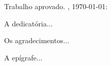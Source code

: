 \imprimircapa
\imprimirfolhaderosto


\begin{folhadeaprovacao}
    \begin{center}
        {\ABNTEXchapterfont\large\imprimirautor}
        \vspace*{\fill}\vspace*{\fill}
        \begin{center}
            \ABNTEXchapterfont\bfseries\Large\imprimirtitulo
        \end{center}
        \vspace*{\fill}
    \hspace{.45\textwidth}
    \begin{minipage}{.5\textwidth}
        \imprimirpreambulo
    \end{minipage}%
    \vspace*{\fill}
    \end{center}

    Trabalho aprovado. \imprimirlocal, \today:

    \begin{center}
        \vspace*{0.5cm}
        {\large\imprimirlocal}
        \par
        {\large\imprimirdata}
        \vspace*{1cm}
    \end{center}
\end{folhadeaprovacao}

\begin{dedicatoria}
	\vspace*{\fill}
	A dedicatória...
	\vspace*{\fill}
\end{dedicatoria}

\begin{agradecimentos}
   Os agradecimentos...
\end{agradecimentos}

\begin{epigrafe}
	\vspace*{\fill}
	\begin{flushright}
		A epígrafe...
	\end{flushright}
\end{epigrafe}

\tableofcontents*
\clearpage

\listoffigures
\clearpage

\listoftables
\clearpage

